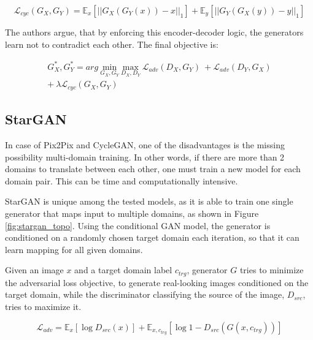 \documentclass{article}
\begin{document}
\begin{equation}
\mathcal{L}_{cyc}(G_{X},G_{Y}) = \mathbb{E}_{x}[||G_{X}(G_{Y}(x)) - x||_{1}] + \mathbb{E}_{y}[||G_{Y}(G_{X}(y)) - y||_{1}]
\label{eq:cyclegan_cycle}
\end{equation}

The authors argue, that by enforcing this encoder-decoder logic, the generators learn not to contradict each other. The final objective is:

\begin{equation}
\begin{split}
G^{*}_{X}, G^{*}_{Y} = arg \ \underset{G_{X}, G_{Y}}{\mathrm{min}} \ \underset{D_{X}, D_{Y}}{\mathrm{max}} \ \mathcal{L}_{adv}(D_{X},G_{Y}) \ +  \mathcal{L}_{adv}(D_{Y}, G_{X}) \\ + \ \lambda \mathcal{L}_{cyc}(G_{X}, G_{Y})
\end{split}
\end{equation}

\subsection{StarGAN}
In case of Pix2Pix and CycleGAN, one of the disadvantages is the missing possibility multi-domain training. In other words, if there are more than 2 domains to translate between each other, one must train a new model for each domain pair. This can be time and computationally intensive.

StarGAN \cite{choi_stargan:_2017} is unique among the tested models, as it is able to train one single generator that maps input to multiple domains, as shown in Figure \ref{fig:stargan_topo}. Using the conditional GAN model, the generator is conditioned on a randomly chosen target domain each iteration, so that it can learn mapping for all given domains. 

Given an image $x$ and a target domain label $c_{trg}$, generator $G$ tries to minimize the adversarial loss objective, to generate real-looking images conditioned on the target domain, while the discriminator classifying the source of the image, $D_{src}$, tries to maximize it.

\begin{equation}
\mathcal{L}_{adv} = \mathbb{E}_{x}[\log D_{src}(x)] + \mathbb{E}_{x, c_{trg}}[\log 1 - D_{src}(G(x, c_{trg}))]
\label{eq:stargan_adv}
\end{equation}
\end{document}
